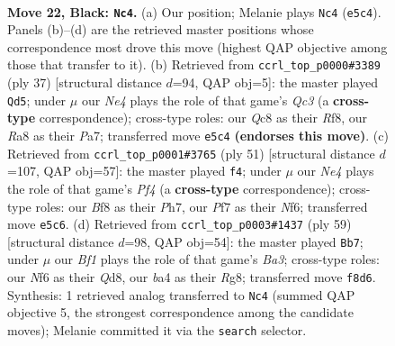 \documentclass[11pt]{article}
\begin{document}
\begin{figure}[p]\centering
\begin{subfigure}{0.46\textwidth}\centering
\resizebox{\linewidth}{!}{%
\newchessgame
\chessboard[
  setfen={r1qk1b1r/p4pp1/3P1n1p/4nP1P/B7/6p1/3Q4/R1B1K1NR b KQ - 2 22},
  showmover=false,
  pgfstyle=straightmove, color=movearrow, markmove={e5-c4}
]}
\caption{}
\end{subfigure}\hfill
\begin{subfigure}{0.46\textwidth}\centering
\resizebox{\linewidth}{!}{%
\newchessgame
\chessboard[
  setfen={1rb2rk1/p3p2p/2q1P1p1/P1p1Nn2/3p3P/8/1P3PP1/R1BQR1K1 b - - 2 19},
  showmover=false,
  pgfstyle=straightmove, color=movearrow, markmove={c6-d5}
]}
\caption{}
\end{subfigure}
\\[4pt]
\begin{subfigure}{0.46\textwidth}\centering
\resizebox{\linewidth}{!}{%
\newchessgame
\chessboard[
  setfen={2r2r1k/1pq4p/p4n2/P1p2p2/2B5/1QN1bPP1/1P5P/R4R1K b - - 0 26},
  showmover=false,
  pgfstyle=straightmove, color=movearrow, markmove={f5-f4}
]}
\caption{}
\end{subfigure}\hfill
\begin{subfigure}{0.46\textwidth}\centering
\resizebox{\linewidth}{!}{%
\newchessgame
\chessboard[
  setfen={3q2rk/7p/bp3p1B/p2PpP2/P5p1/2RPQ1Pn/1P6/5R1K b - - 0 30},
  showmover=false,
  pgfstyle=straightmove, color=movearrow, markmove={a6-b7}
]}
\caption{}
\end{subfigure}
\caption{\textbf{Move 22, Black: \texttt{Nc4}.} (a) Our position; Melanie plays \texttt{Nc4} (\texttt{e5c4}). Panels (b)--(d) are the retrieved master positions whose correspondence most drove this move (highest QAP objective among those that transfer to it). (b) Retrieved from \texttt{ccrl\_top\_p0000\#3389} (ply 37) [structural distance $d$=94, QAP obj=5]: the master played \texttt{Qd5}; under $\mu$ our \emph{Ne4} plays the role of that game's \emph{Qc3} (a \textbf{cross-type} correspondence); cross-type roles: our \emph{Q}c8 as their \emph{R}f8, our \emph{R}a8 as their \emph{P}a7; transferred move \texttt{e5c4} \textbf{(endorses this move)}. (c) Retrieved from \texttt{ccrl\_top\_p0001\#3765} (ply 51) [structural distance $d$=107, QAP obj=57]: the master played \texttt{f4}; under $\mu$ our \emph{Ne4} plays the role of that game's \emph{Pf4} (a \textbf{cross-type} correspondence); cross-type roles: our \emph{B}f8 as their \emph{P}h7, our \emph{P}f7 as their \emph{N}f6; transferred move \texttt{e5c6}. (d) Retrieved from \texttt{ccrl\_top\_p0003\#1437} (ply 59) [structural distance $d$=98, QAP obj=54]: the master played \texttt{Bb7}; under $\mu$ our \emph{Bf1} plays the role of that game's \emph{Ba3}; cross-type roles: our \emph{N}f6 as their \emph{Q}d8, our \emph{b}a4 as their \emph{R}g8; transferred move \texttt{f8d6}. Synthesis: 1 retrieved analog transferred to \texttt{Nc4} (summed QAP objective 5, the strongest correspondence among the candidate moves); Melanie committed it via the \texttt{search} selector.}
\label{fig:thought-m43}
\end{figure}
\end{document}
